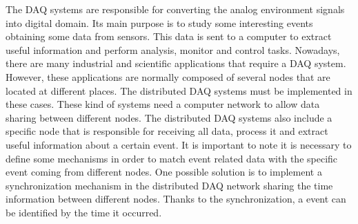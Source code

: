 The DAQ \cite{daq:book1} systems are responsible for converting the analog environment signals into digital domain. Its main purpose is to study some interesting events obtaining some data from sensors. This data is sent to a computer to extract useful information and perform analysis, monitor and control tasks. Nowadays, there are many industrial \cite{daq:res} and scientific applications \cite{daq:sensor-networks} that require a DAQ system. However, these applications are normally composed of several nodes that are located at different places. The distributed DAQ systems must be implemented in these cases. These kind of systems need a computer network to allow data sharing between different nodes. The distributed DAQ systems also include a specific node that is responsible for receiving all data, process it and extract useful information about a certain event. It is important to note it is necessary to define some mechanisms in order to match event related data with the specific event coming from different nodes. One possible solution is to implement a synchronization mechanism in the distributed DAQ network sharing the time information between different nodes. Thanks to the synchronization, a event can be identified by the time it occurred.


